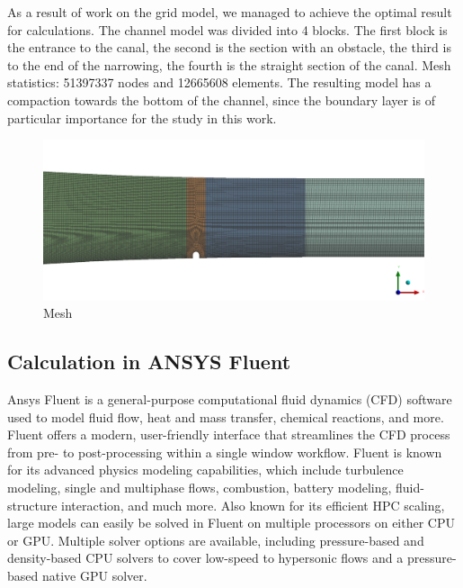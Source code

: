 	As a result of work on the grid model, we managed to achieve the optimal result for calculations. The channel model was divided into 4 blocks. The first block is the entrance to the canal, the second is the section with an obstacle, the third is to the end of the narrowing, the fourth is the straight section of the canal. Mesh statistics: 51397337 nodes and 12665608 elements. The resulting model has a compaction towards the bottom of the channel, since the boundary layer is of particular importance for the study in this work.
	\begin{figure}[H]
		\centering
		\includegraphics[width=1\linewidth]{../Assets/Mesh1}
		\caption{\footnotesize{Mesh}}
		\label{fig:mesh1}
	\end{figure}
	
\subsection{Calculation in ANSYS Fluent}
	Ansys Fluent is a general-purpose computational fluid dynamics (CFD) software used to model fluid flow, heat and mass transfer, chemical reactions, and more. Fluent offers a modern, user-friendly interface that streamlines the CFD process from pre- to post-processing within a single window workflow. Fluent is known for its advanced physics modeling capabilities, which include turbulence modeling, single and multiphase flows, combustion, battery modeling, fluid-structure interaction, and much more. Also known for its efficient HPC scaling, large models can easily be solved in Fluent on multiple processors on either CPU or GPU. Multiple solver options are available, including pressure-based and density-based CPU solvers to cover low-speed to hypersonic flows and a pressure-based native GPU solver.
	
